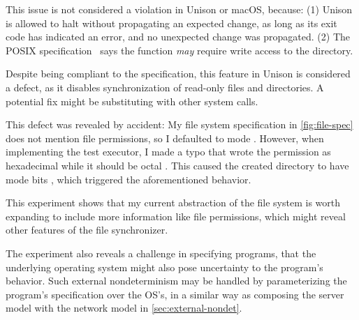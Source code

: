This issue is not considered a violation in Unison or macOS, because: (1) Unison
is allowed to halt without propagating an expected change, as long as its exit
code has indicated an error, and no unexpected change was propagated.  (2) The
POSIX specification~\cite{posix} says the  function {\it may}
require write access to the directory.

Despite being compliant to the specification, this feature in Unison is
considered a defect, as it disables synchronization of read-only files and
directories.  A potential fix might be substituting  with other
system calls.

This defect was revealed by accident: My file system specification in
\autoref{fig:file-spec} does not mention file permissions, so I defaulted to
mode .  However, when implementing the test executor, I made a typo
that wrote the permission as hexadecimal  while it should be octal
.  This caused the created directory to have mode bits ,
which triggered the aforementioned behavior.

This experiment shows that my current abstraction of the file system is worth
expanding to include more information like file permissions, which might reveal
other features of the file synchronizer.

The experiment also reveals a challenge in specifying programs, that the
underlying operating system might also pose uncertainty to the program's
behavior.  Such external nondeterminism may be handled by parameterizing the
program's specification over the OS's, in a similar way as composing the server
model with the network model in \autoref{sec:external-nondet}.
